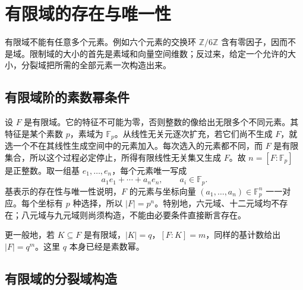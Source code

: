 
\section{有限域的存在与唯一性}
\label{b1:sec:1701}

%
%

有限域不能有任意多个元素。例如六个元素的交换环 \(\mathbb Z/6\mathbb Z\) 含有零因子，因而不是域。限制域的大小的首先是素域和向量空间维数；反过来，给定一个允许的大小，分裂域把所需的全部元素一次构造出来。

\subsection{有限域阶的素数幂条件}
\label{b1:subsec:1701:01}

设 \(F\) 是有限域。它的特征不可能为零，否则整数的像给出无限多个不同元素。其特征是某个素数 \(p\)，素域为 \(\mathbb F_p\)。从线性无关元逐次扩充，若它们尚不生成 \(F\)，就选一个不在其线性生成空间中的元素加入。每次选入的元素都不同，而 \(F\) 是有限集合，所以这个过程必定停止，所得有限线性无关集又生成 \(F\)。故 \(n=[F:\mathbb F_p]\) 是正整数。取一组基 \(e_1,\ldots,e_n\)，每个元素唯一写成
\[
	a_1e_1+\cdots+a_ne_n,\qquad a_i\in\mathbb F_p.
\]
基表示的存在性与唯一性说明，\(F\) 的元素与坐标向量 \((a_1,\ldots,a_n)\in\mathbb F_p^n\) 一一对应。每个坐标有 \(p\) 种选择，所以 \(|F|=p^n\)。特别地，六元域、十二元域均不存在；八元域与九元域则尚须构造，不能由必要条件直接断言存在。

\ProseParagraphBreak
更一般地，若 \(K\subseteq F\) 是有限域，\(|K|=q\)，\([F:K]=m\)，同样的基计数给出 \(|F|=q^m\)。这里 \(q\) 本身已经是素数幂。

\subsection{有限域的分裂域构造}
\label{b1:subsec:1701:02}

